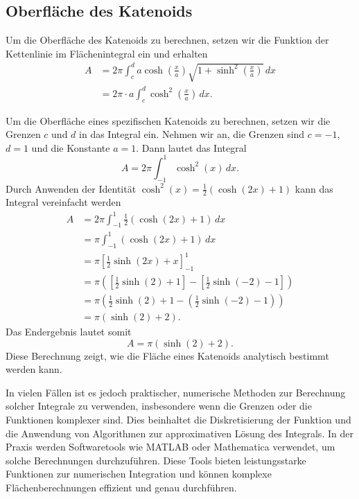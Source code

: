\subsection{Oberfläche des Katenoids
	\label{Das Katenoid:subsection:Oberfläche des Katenoids}}
Um die Oberfläche des Katenoids zu berechnen, setzen wir die Funktion der Kettenlinie im Flächenintegral ein und erhalten 
\begin{align}
	A &= 2\pi \int_{c}^{d} a \cosh \left( \frac{x}{a} \right) \sqrt{1 + \sinh^2 \left( \frac{x}{a} \right)} \,dx \\
	&= 2\pi \cdot a \int_{c}^{d} \cosh^2 \left( \frac{x}{a} \right) \,dx.
\end{align}
\begin{beispiel}
Um die Oberfläche eines spezifischen Katenoids zu berechnen, setzen wir die Grenzen $c$ und $d$ in das Integral ein.
Nehmen wir an, die Grenzen sind $c =-1$, $d=1$ und die Konstante $a=1$.
Dann lautet das Integral	
\[
A = 2\pi \int_{-1}^{1} \cosh^2 (x) \, dx.
\]
%
Durch Anwenden der Identität \(\cosh^2 (x) = \frac{1}{2} (\cosh (2x) + 1)\) kann das Integral vereinfacht werden
\begin{align*}
	A &= 2\pi \int_{-1}^{1} \frac{1}{2} (\cosh (2x) + 1) \, dx \\
	&= \pi \int_{-1}^{1} (\cosh (2x) + 1) \,dx \\
	&= \pi \left[ \frac{1}{2} \sinh (2x) + x \right]_{-1}^{1} \\
	&= \pi \left( \left[ \frac{1}{2} \sinh (2) + 1 \right] - \left[ \frac{1}{2} \sinh (-2) - 1 \right] \right) \\
	&= \pi \left( \frac{1}{2} \sinh (2) + 1 - \left( \frac{1}{2} \sinh (-2) - 1 \right) \right) \\
	&= \pi \left( \sinh (2) + 2 \right).
\end{align*}
%
Das Endergebnis lautet somit
\[
A = \pi (\sinh (2) + 2).
\]
Diese Berechnung zeigt, wie die Fläche eines Katenoids analytisch bestimmt werden kann.
\end{beispiel}
In vielen Fällen ist es jedoch praktischer, numerische Methoden zur Berechnung solcher Integrale zu verwenden, insbesondere wenn die Grenzen oder die Funktionen komplexer sind.
Dies beinhaltet die Diskretisierung der Funktion und die Anwendung von Algorithmen zur approximativen Lösung des Integrals.
In der Praxis werden Softwaretools wie MATLAB oder Mathematica verwendet, um solche Berechnungen durchzuführen.
Diese Tools bieten leistungsstarke Funktionen zur numerischen Integration und können komplexe Flächenberechnungen effizient und genau durchführen.

